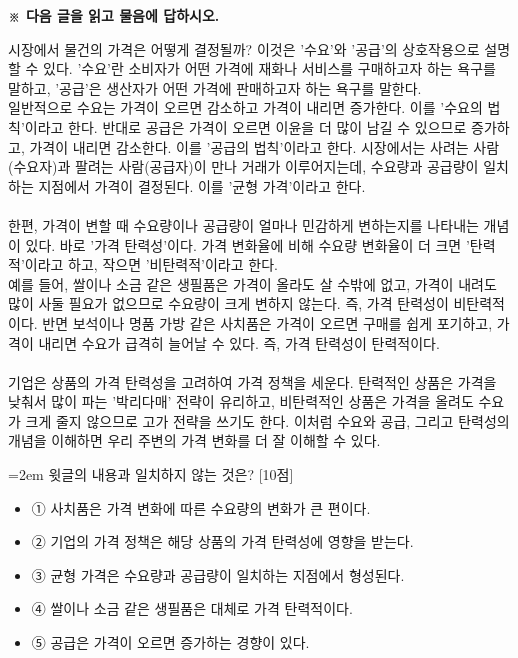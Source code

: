 \documentclass[11pt,a4paper]{article}
\newcommand{\qnum}[1]{%
  \tikz[baseline=(num.base)]{%
    \node[circle, fill=numCircle, text=white, inner sep=0pt,
          minimum size=18pt, font=\small\bfseries] (num) {#1};%
  }%
}
\newcommand{\pts}[1]{%
  \hfill\textcolor{ptsBadge}{[#1점]}%
}
\begin{document}
\vspace{4mm}
{\small\textbf{※ 다음 글을 읽고 물음에 답하시오.}}
\vspace{2mm}
\begin{tcolorbox}[passage]
시장에서 물건의 가격은 어떻게 결정될까? 이것은 '수요'와 '공급'의 상호작용으로 설명할 수 있다. '수요'란 소비자가 어떤 가격에 재화나 서비스를 구매하고자 하는 욕구를 말하고, '공급'은 생산자가 어떤 가격에 판매하고자 하는 욕구를 말한다. \\{}
일반적으로 수요는 가격이 오르면 감소하고 가격이 내리면 증가한다. 이를 '수요의 법칙'이라고 한다. 반대로 공급은 가격이 오르면 이윤을 더 많이 남길 수 있으므로 증가하고, 가격이 내리면 감소한다. 이를 '공급의 법칙'이라고 한다. 시장에서는 사려는 사람(수요자)과 팔려는 사람(공급자)이 만나 거래가 이루어지는데, 수요량과 공급량이 일치하는 지점에서 가격이 결정된다. 이를 '균형 가격'이라고 한다. \\{}
\vspace{4pt} \\{}
한편, 가격이 변할 때 수요량이나 공급량이 얼마나 민감하게 변하는지를 나타내는 개념이 있다. 바로 '가격 탄력성'이다. 가격 변화율에 비해 수요량 변화율이 더 크면 '탄력적'이라고 하고, 작으면 '비탄력적'이라고 한다. \\{}
예를 들어, 쌀이나 소금 같은 생필품은 가격이 올라도 살 수밖에 없고, 가격이 내려도 많이 사둘 필요가 없으므로 수요량이 크게 변하지 않는다. 즉, 가격 탄력성이 비탄력적이다. 반면 보석이나 명품 가방 같은 사치품은 가격이 오르면 구매를 쉽게 포기하고, 가격이 내리면 수요가 급격히 늘어날 수 있다. 즉, 가격 탄력성이 탄력적이다. \\{}
\vspace{4pt} \\{}
기업은 상품의 가격 탄력성을 고려하여 가격 정책을 세운다. 탄력적인 상품은 가격을 낮춰서 많이 파는 '박리다매' 전략이 유리하고, 비탄력적인 상품은 가격을 올려도 수요가 크게 줄지 않으므로 고가 전략을 쓰기도 한다. 이처럼 수요와 공급, 그리고 탄력성의 개념을 이해하면 우리 주변의 가격 변화를 더 잘 이해할 수 있다.
\end{tcolorbox}
\vspace{3mm}
\begin{minipage}{\columnwidth}
{\hangindent=2em
\qnum{9}\enspace 윗글의 내용과 일치하지 않는 것은? \pts{10}
\par}

\vspace{3mm}
\begin{itemize}[leftmargin=2.5em, labelsep=0.3em, label={}, itemsep=4pt, parsep=1pt, topsep=0pt]
  \item ① 사치품은 가격 변화에 따른 수요량의 변화가 큰 편이다.
  \item ② 기업의 가격 정책은 해당 상품의 가격 탄력성에 영향을 받는다.
  \item ③ 균형 가격은 수요량과 공급량이 일치하는 지점에서 형성된다.
  \item ④ 쌀이나 소금 같은 생필품은 대체로 가격 탄력적이다.
  \item ⑤ 공급은 가격이 오르면 증가하는 경향이 있다.
\end{itemize}
\end{minipage}
\vspace{4mm}
\end{document}
